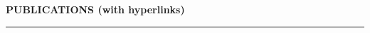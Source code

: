 \documentclass{resume} %
\begin{document}







\textbf{PUBLICATIONS (with hyperlinks)}
\vspace{.3cm}
\hrule















\end{document}
